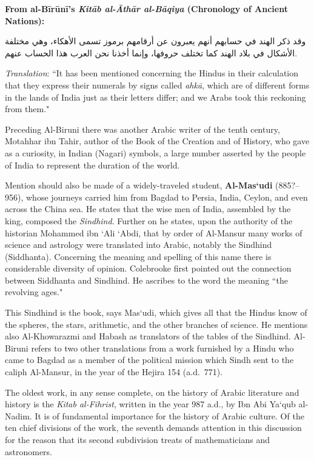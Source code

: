 \documentclass[11pt,a4paper]{article}
\newcommand{\ar}[1]{{\arabicfont #1}}
\newenvironment{arabicpassage}{%
  \begin{tcolorbox}[colback=arabicbg,colframe=rulecolor,boxrule=0.5pt,
    left=8pt,right=8pt,top=6pt,bottom=6pt,fontupper=\arabicfont\large]
}{\end{tcolorbox}}
\begin{document}
\begin{arabicpassage}
\textbf{From al-B\=ir\=un\=i's \textit{Kit\=ab al-\=Ath\=ar al-B\=aqiya} (Chronology of Ancient Nations):}

\vspace{0.5em}
\ar{وقد ذكر الهند في حسابهم أنهم يعبرون عن أرقامهم برموز تسمى الأهكاء، وهي مختلفة الأشكال في بلاد الهند كما تختلف حروفها، وإنما أخذنا نحن العرب هذا الحساب عنهم.}

\vspace{0.5em}
\textit{Translation}: ``It has been mentioned concerning the Hindus in their calculation that they express their numerals by signs called \textit{ahk\=a}, which are of different forms in the lands of India just as their letters differ; and we Arabs took this reckoning from them."
\end{arabicpassage}

Preceding Al-Biruni there was another Arabic writer of the tenth century, Motahhar ibn Tahir, author of the Book of the Creation and of History, who gave as a curiosity, in Indian (Nagari) symbols, a large number asserted by the people of India to represent the duration of the world.

Mention should also be made of a widely-traveled student, \textbf{Al-Mas`udi} (885?--956), whose journeys carried him from Bagdad to Persia, India, Ceylon, and even across the China sea. He states that the wise men of India, assembled by the king, composed the \textit{Sindhind}. Further on he states, upon the authority of the historian Mohammed ibn `Ali `Abdi, that by order of Al-Mansur many works of science and astrology were translated into Arabic, notably the Sindhind (Siddhanta). Concerning the meaning and spelling of this name there is considerable diversity of opinion. Colebrooke first pointed out the connection between Siddhanta and Sindhind. He ascribes to the word the meaning ``the revolving ages."

This Sindhind is the book, says Mas`udi, which gives all that the Hindus know of the spheres, the stars, arithmetic, and the other branches of science. He mentions also Al-Khowarazmi and Habash as translators of the tables of the Sindhind. Al-Biruni refers to two other translations from a work furnished by a Hindu who came to Bagdad as a member of the political mission which Sindh sent to the caliph Al-Mansur, in the year of the Hejira 154 (a.d.~771).

The oldest work, in any sense complete, on the history of Arabic literature and history is the \textit{Kitab al-Fihrist}, written in the year 987 a.d., by Ibn Abi Ya`qub al-Nadim. It is of fundamental importance for the history of Arabic culture. Of the ten chief divisions of the work, the seventh demands attention in this discussion for the reason that its second subdivision treats of mathematicians and astronomers.
\end{document}
